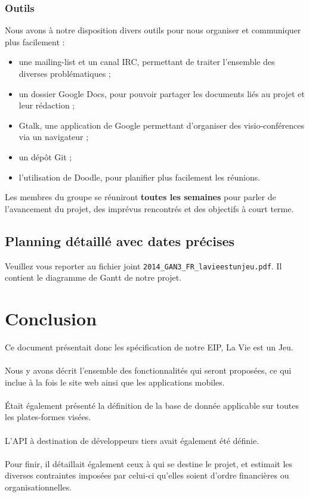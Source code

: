 \documentclass{life-fr}
\begin{document}
\subsection{ Outils}

Nous avons à notre disposition divers outils pour nous organiser et communiquer plus facilement :\\

\begin{itemize}
  \item une mailing-list et un canal IRC, permettant de traiter l'ensemble des diverses problématiques ;
  \item un dossier Google Docs, pour pouvoir partager les documents liés au projet et leur rédaction ;
  \item Gtalk, une application de Google permettant d'organiser des visio-conférences via un navigateur ;
  \item un dépôt Git ;
  \item l'utilisation de Doodle, pour planifier plus facilement les réunions.
\end{itemize}

Les membres du groupe se réuniront \textbf{toutes les semaines} pour parler de l'avancement du projet, des imprévus rencontrés et des objectifs à court terme.


\section{Planning détaillé avec dates précises}

Veuillez vous reporter au fichier joint \texttt{2014\_GAN3\_FR\_lavieestunjeu.pdf}. Il contient le diagramme de Gantt de notre projet.


\chapter{Conclusion}


Ce document présentait donc les spécification de notre EIP, La Vie est un Jeu.\\
\\
Nous y avons décrit l'ensemble des fonctionnalités qui seront proposées, ce qui inclue à la fois le site web ainsi que les applications mobiles.\\
\\
Était également présenté la définition de la base de donnée applicable sur toutes les plates-formes visées.\\
\\
L’API à destination de développeurs tiers avait également été définie.\\
\\
Pour finir, il détaillait également ceux à qui se destine le projet, et estimait les diverses contraintes imposées par celui-ci qu’elles soient d’ordre financières ou organisationnelles.\\
\end{document}
